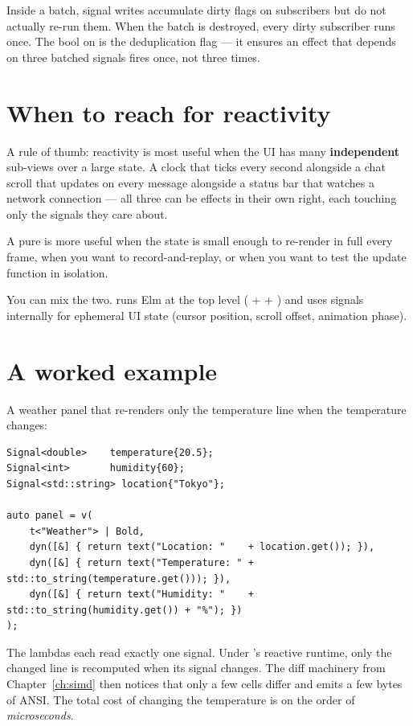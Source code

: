 Inside a batch, signal writes accumulate dirty flags on subscribers
but do not actually re-run them. When the batch is destroyed, every
dirty subscriber runs once. The  bool on
 is the deduplication flag --- it ensures an
effect that depends on three batched signals fires once, not three
times.

\section{When to reach for reactivity}

A rule of thumb: reactivity is most useful when the UI has many
\textbf{independent} sub-views over a large state. A clock that
ticks every second alongside a chat scroll that updates on every
message alongside a status bar that watches a network connection
--- all three can be effects in their own right, each touching only
the signals they care about.

A pure  is more useful when the state is small enough
to re-render in full every frame, when you want to record-and-replay,
or when you want to test the update function in isolation.

You can mix the two. \agentty{} runs Elm at the top level
( +  + ) and uses signals
internally for ephemeral UI state (cursor position, scroll offset,
animation phase).

\section{A worked example}

A weather panel that re-renders only the temperature line when the
temperature changes:

\begin{lstlisting}
Signal<double>    temperature{20.5};
Signal<int>       humidity{60};
Signal<std::string> location{"Tokyo"};

auto panel = v(
    t<"Weather"> | Bold,
    dyn([&] { return text("Location: "    + location.get()); }),
    dyn([&] { return text("Temperature: " + std::to_string(temperature.get())); }),
    dyn([&] { return text("Humidity: "    + std::to_string(humidity.get()) + "%"); })
);
\end{lstlisting}

The  lambdas each read exactly one signal. Under
\maya{}'s reactive runtime, only the changed line is recomputed when
its signal changes. The diff machinery from Chapter~\ref{ch:simd}
then notices that only a few cells differ and emits a few bytes of
ANSI. The total cost of changing the temperature is on the order of
\emph{microseconds}.

